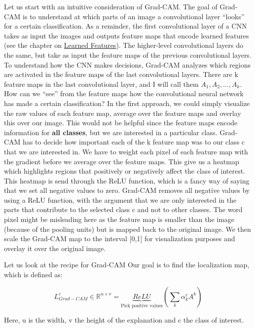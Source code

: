 \documentclass[12pt,]{krantz}
\begin{document}
Let us start with an intuitive consideration of Grad-CAM. The goal of
Grad-CAM is to understand at which parts of an image a convolutional
layer ``looks'' for a certain classification. As a reminder, the first
convolutional layer of a CNN takes as input the images and outputs
feature maps that encode learned features (see the chapter on
\protect\hyperlink{cnn-features}{Learned Features}). The higher-level
convolutional layers do the same, but take as input the feature maps of
the previous convolutional layers. To understand how the CNN makes
decisions, Grad-CAM analyzes which regions are activated in the feature
maps of the last convolutional layers. There are k feature maps in the
last convolutional layer, and I will call them
\(A_1, A_2, \ldots, A_k\). How can we ``see'' from the feature maps how
the convolutional neural network has made a certain classification? In
the first approach, we could simply visualize the raw values of each
feature map, average over the feature maps and overlay this over our
image. This would not be helpful since the feature maps encode
information for \textbf{all classes}, but we are interested in a
particular class. Grad-CAM has to decide how important each of the k
feature map was to our class c that we are interested in. We have to
weight each pixel of each feature map with the gradient before we
average over the feature maps. This give us a heatmap which highlights
regions that positively or negatively affect the class of interest. This
heatmap is send through the ReLU function, which is a fancy way of
saying that we set all negative values to zero. Grad-CAM removes all
negative values by using a ReLU function, with the argument that we are
only interested in the parts that contribute to the selected class c and
not to other classes. The word pixel might be misleading here as the
feature map is smaller than the image (because of the pooling units) but
is mapped back to the original image. We then scale the Grad-CAM map to
the interval {[}0,1{]} for visualization purposes and overlay it over
the original image.

Let us look at the recipe for Grad-CAM Our goal is to find the
localization map, which is defined as:

\[L^c_{Grad-CAM} \in \mathbb{R}^{u\times v} = \underbrace{ReLU}_{\text{Pick positive values}}\left(\sum_{k} \alpha_k^c A^k\right)\]

Here, u is the width, v the height of the explanation and c the class of
interest.
\end{document}
